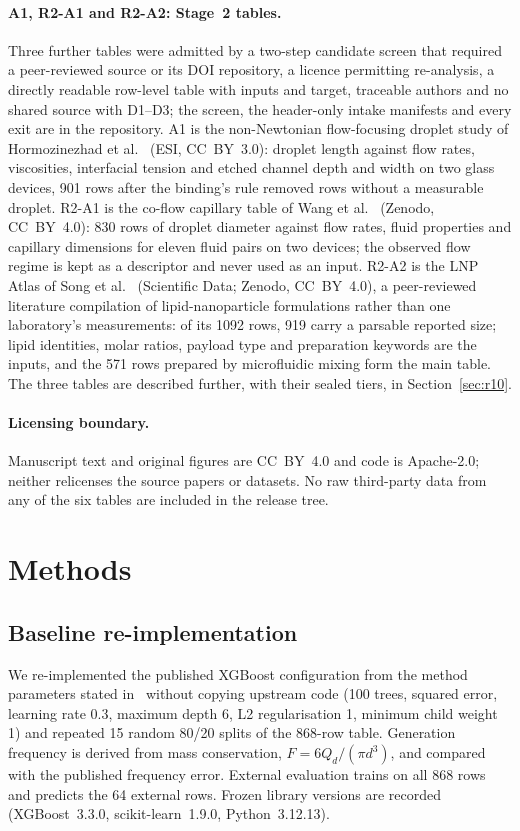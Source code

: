 \documentclass[11pt,a4paper]{article}
\begin{document}
\paragraph{A1, R2-A1 and R2-A2: Stage~2 tables.} Three further tables were
admitted by a two-step candidate screen that required a peer-reviewed source
or its DOI repository, a licence permitting re-analysis, a directly readable
row-level table with inputs and target, traceable authors and no shared source
with D1--D3; the screen, the header-only intake manifests and every exit are
in the repository. A1 is the non-Newtonian flow-focusing droplet study of
Hormozinezhad et al.~\cite{labchip2025dimless} (ESI, CC~BY~3.0): droplet length
against flow rates, viscosities, interfacial tension and etched channel depth
and width on two glass devices, 901 rows after the binding's rule removed rows
without a measurable droplet. R2-A1 is the co-flow capillary table of Wang et
al.~\cite{wang2024coflow} (Zenodo, CC~BY~4.0): 830 rows of droplet diameter
against flow rates, fluid properties and capillary dimensions for eleven fluid
pairs on two devices; the observed flow regime is kept as a descriptor and
never used as an input. R2-A2 is the LNP Atlas of Song et
al.~\cite{lnpatlas2025} (Scientific Data; Zenodo, CC~BY~4.0), a
peer-reviewed literature compilation of lipid-nanoparticle formulations rather
than one laboratory's measurements: of its 1092 rows, 919 carry a parsable
reported size; lipid identities, molar ratios, payload type and preparation
keywords are the inputs, and the 571 rows prepared by microfluidic mixing form
the main table. The three tables are described further, with their sealed
tiers, in Section~\ref{sec:r10}.

\paragraph{Licensing boundary.} Manuscript text and original figures are
CC~BY~4.0 and code is Apache-2.0; neither relicenses the source papers or
datasets. No raw third-party data from any of the six tables are included in
the release tree.

\section{Methods}
\label{sec:methods}

\subsection{Baseline re-implementation}
\label{sec:e0}
We re-implemented the published XGBoost configuration from the method
parameters stated in~\cite{lashkaripour2024} without copying upstream code
(100 trees, squared error, learning rate 0.3, maximum depth 6, L2
regularisation 1, minimum child weight 1) and repeated 15 random 80/20 splits
of the 868-row table. Generation frequency is derived from mass conservation,
$F = 6Q_d/(\pi d^3)$, and compared with the published frequency error.
External evaluation trains on all 868 rows and predicts the 64 external rows.
Frozen library versions are recorded (XGBoost~3.3.0, scikit-learn~1.9.0,
Python~3.12.13).
\end{document}
